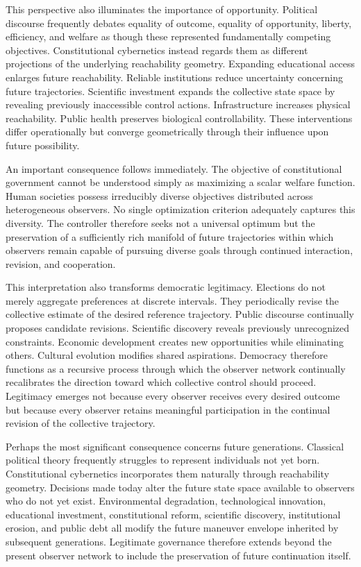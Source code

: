 \documentclass[12pt,a4paper]{article}
\begin{document}
This perspective also illuminates the importance of opportunity. Political discourse frequently debates equality of outcome, equality of opportunity, liberty, efficiency, and welfare as though these represented fundamentally competing objectives. Constitutional cybernetics instead regards them as different projections of the underlying reachability geometry. Expanding educational access enlarges future reachability. Reliable institutions reduce uncertainty concerning future trajectories. Scientific investment expands the collective state space by revealing previously inaccessible control actions. Infrastructure increases physical reachability. Public health preserves biological controllability. These interventions differ operationally but converge geometrically through their influence upon future possibility.

An important consequence follows immediately. The objective of constitutional government cannot be understood simply as maximizing a scalar welfare function. Human societies possess irreducibly diverse objectives distributed across heterogeneous observers. No single optimization criterion adequately captures this diversity. The controller therefore seeks not a universal optimum but the preservation of a sufficiently rich manifold of future trajectories within which observers remain capable of pursuing diverse goals through continued interaction, revision, and cooperation.

This interpretation also transforms democratic legitimacy. Elections do not merely aggregate preferences at discrete intervals. They periodically revise the collective estimate of the desired reference trajectory. Public discourse continually proposes candidate revisions. Scientific discovery reveals previously unrecognized constraints. Economic development creates new opportunities while eliminating others. Cultural evolution modifies shared aspirations. Democracy therefore functions as a recursive process through which the observer network continually recalibrates the direction toward which collective control should proceed. Legitimacy emerges not because every observer receives every desired outcome but because every observer retains meaningful participation in the continual revision of the collective trajectory.

Perhaps the most significant consequence concerns future generations. Classical political theory frequently struggles to represent individuals not yet born. Constitutional cybernetics incorporates them naturally through reachability geometry. Decisions made today alter the future state space available to observers who do not yet exist. Environmental degradation, technological innovation, educational investment, constitutional reform, scientific discovery, institutional erosion, and public debt all modify the future maneuver envelope inherited by subsequent generations. Legitimate governance therefore extends beyond the present observer network to include the preservation of future continuation itself.
\end{document}
